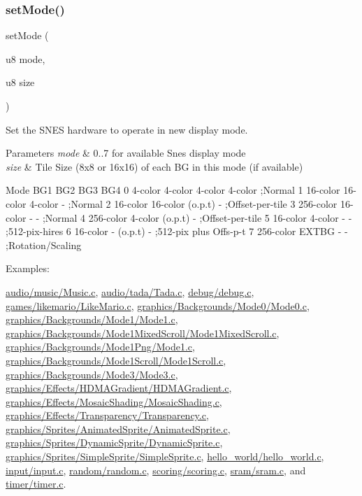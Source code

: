 \subsubsection{\texorpdfstring{set\+Mode()}{setMode()}}
{\footnotesize\ttfamily set\+Mode (\begin{DoxyParamCaption}\item[{u8}]{mode,  }\item[{u8}]{size }\end{DoxyParamCaption})}



Set the S\+N\+ES hardware to operate in new display mode. 


\begin{DoxyParams}{Parameters}
{\em mode} & 0..7 for available Snes display mode \\
\hline
{\em size} & Tile Size (8x8 or 16x16) of each BG in this mode (if available)\\
\hline
\end{DoxyParams}
Mode B\+G1 B\+G2 B\+G3 B\+G4 0 4-\/color 4-\/color 4-\/color 4-\/color ;Normal 1 16-\/color 16-\/color 4-\/color -\/ ;Normal 2 16-\/color 16-\/color (o.\+p.\+t) -\/ ;Offset-\/per-\/tile 3 256-\/color 16-\/color -\/ -\/ ;Normal 4 256-\/color 4-\/color (o.\+p.\+t) -\/ ;Offset-\/per-\/tile 5 16-\/color 4-\/color -\/ -\/ ;512-\/pix-\/hires 6 16-\/color -\/ (o.\+p.\+t) -\/ ;512-\/pix plus Offs-\/p-\/t 7 256-\/color E\+X\+T\+BG -\/ -\/ ;Rotation/\+Scaling \begin{Desc}
\item[Examples\+: ]\par
\hyperlink{a00437}{audio/music/\+Music.\+c}, \hyperlink{a00439}{audio/tada/\+Tada.\+c}, \hyperlink{a00441}{debug/debug.\+c}, \hyperlink{a00435}{games/likemario/\+Like\+Mario.\+c}, \hyperlink{a00405}{graphics/\+Backgrounds/\+Mode0/\+Mode0.\+c}, \hyperlink{a00407}{graphics/\+Backgrounds/\+Mode1/\+Mode1.\+c}, \hyperlink{a00413}{graphics/\+Backgrounds/\+Mode1\+Mixed\+Scroll/\+Mode1\+Mixed\+Scroll.\+c}, \hyperlink{a00409}{graphics/\+Backgrounds/\+Mode1\+Png/\+Mode1.\+c}, \hyperlink{a00411}{graphics/\+Backgrounds/\+Mode1\+Scroll/\+Mode1\+Scroll.\+c}, \hyperlink{a00415}{graphics/\+Backgrounds/\+Mode3/\+Mode3.\+c}, \hyperlink{a00419}{graphics/\+Effects/\+H\+D\+M\+A\+Gradient/\+H\+D\+M\+A\+Gradient.\+c}, \hyperlink{a00421}{graphics/\+Effects/\+Mosaic\+Shading/\+Mosaic\+Shading.\+c}, \hyperlink{a00423}{graphics/\+Effects/\+Transparency/\+Transparency.\+c}, \hyperlink{a00427}{graphics/\+Sprites/\+Animated\+Sprite/\+Animated\+Sprite.\+c}, \hyperlink{a00429}{graphics/\+Sprites/\+Dynamic\+Sprite/\+Dynamic\+Sprite.\+c}, \hyperlink{a00425}{graphics/\+Sprites/\+Simple\+Sprite/\+Simple\+Sprite.\+c}, \hyperlink{a00403}{hello\+\_\+world/hello\+\_\+world.\+c}, \hyperlink{a00431}{input/input.\+c}, \hyperlink{a00443}{random/random.\+c}, \hyperlink{a00447}{scoring/scoring.\+c}, \hyperlink{a00445}{sram/sram.\+c}, and \hyperlink{a00433}{timer/timer.\+c}.\end{Desc}
\mbox{\label{a00368_af7e722fd2eba5682bc0eafa9d5a9c51a}} 
